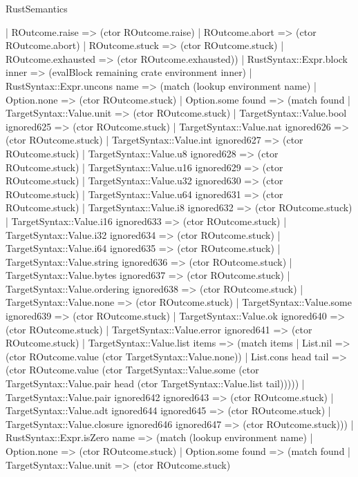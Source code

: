 \begin{lexlean}{RustSemantics}
\begin{semanticmodule}
{        | ROutcome.raise => (ctor ROutcome.raise)
        | ROutcome.abort => (ctor ROutcome.abort)
        | ROutcome.stuck => (ctor ROutcome.stuck)
        | ROutcome.exhausted => (ctor ROutcome.exhausted))
      | RustSyntax::Expr.block inner => (evalBlock remaining crate environment inner)
      | RustSyntax::Expr.uncons name => (match (lookup environment name)
        | Option.none => (ctor ROutcome.stuck)
        | Option.some found => (match found
          | TargetSyntax::Value.unit => (ctor ROutcome.stuck)
          | TargetSyntax::Value.bool ignored625 => (ctor ROutcome.stuck)
          | TargetSyntax::Value.nat ignored626 => (ctor ROutcome.stuck)
          | TargetSyntax::Value.int ignored627 => (ctor ROutcome.stuck)
          | TargetSyntax::Value.u8 ignored628 => (ctor ROutcome.stuck)
          | TargetSyntax::Value.u16 ignored629 => (ctor ROutcome.stuck)
          | TargetSyntax::Value.u32 ignored630 => (ctor ROutcome.stuck)
          | TargetSyntax::Value.u64 ignored631 => (ctor ROutcome.stuck)
          | TargetSyntax::Value.i8 ignored632 => (ctor ROutcome.stuck)
          | TargetSyntax::Value.i16 ignored633 => (ctor ROutcome.stuck)
          | TargetSyntax::Value.i32 ignored634 => (ctor ROutcome.stuck)
          | TargetSyntax::Value.i64 ignored635 => (ctor ROutcome.stuck)
          | TargetSyntax::Value.string ignored636 => (ctor ROutcome.stuck)
          | TargetSyntax::Value.bytes ignored637 => (ctor ROutcome.stuck)
          | TargetSyntax::Value.ordering ignored638 => (ctor ROutcome.stuck)
          | TargetSyntax::Value.none => (ctor ROutcome.stuck)
          | TargetSyntax::Value.some ignored639 => (ctor ROutcome.stuck)
          | TargetSyntax::Value.ok ignored640 => (ctor ROutcome.stuck)
          | TargetSyntax::Value.error ignored641 => (ctor ROutcome.stuck)
          | TargetSyntax::Value.list items => (match items
            | List.nil => (ctor ROutcome.value (ctor TargetSyntax::Value.none))
            | List.cons head tail => (ctor ROutcome.value (ctor TargetSyntax::Value.some (ctor TargetSyntax::Value.pair head (ctor TargetSyntax::Value.list tail)))))
          | TargetSyntax::Value.pair ignored642 ignored643 => (ctor ROutcome.stuck)
          | TargetSyntax::Value.adt ignored644 ignored645 => (ctor ROutcome.stuck)
          | TargetSyntax::Value.closure ignored646 ignored647 => (ctor ROutcome.stuck)))
      | RustSyntax::Expr.isZero name => (match (lookup environment name)
        | Option.none => (ctor ROutcome.stuck)
        | Option.some found => (match found
          | TargetSyntax::Value.unit => (ctor ROutcome.stuck)
}
\end{semanticmodule}
\end{lexlean}
